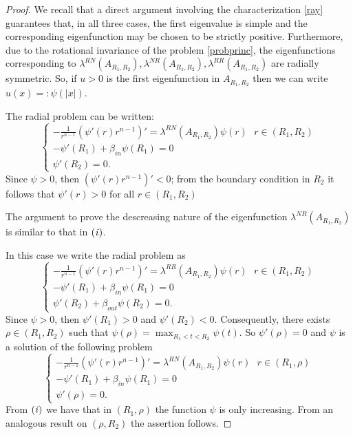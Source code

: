 \documentclass[oneside,a4paper,11pt,notitlepage]{article}
\theoremstyle{plain}
\numberwithin{teor}{section}
\numberwithin{equation}{section}
\theoremstyle{definition}
\theoremstyle{plain}
\theoremstyle{plain}
\theoremstyle{plain}
\theoremstyle{plain}
\theoremstyle{definition}
\theoremstyle{definition}
\theoremstyle{plain}
\begin{document}
\begin{proof} We recall that a direct argument involving the characterization \eqref{ray} guarantees that, in all three cases, the first eigenvalue is simple and the corresponding eigenfunction may be chosen to be strictly positive.
Furthermore, due to the rotational invariance of the problem \eqref{probprinc}, the eigenfunctions corresponding to $\lambda^{RN}(A_{R_1,R_2}),\lambda^{NR}(A_{R_1,R_2}),\lambda^{RR}(A_{R_1,R_2})$ are radially symmetric. So, if $u>0$ is the first eigenfunction in $A_{R_1,R_2}$ then we can write $u(x)=:\psi(|x|)$.
\item[\it{(i)}] The radial problem can be written:
\begin{equation}
   \begin{cases}
       \displaystyle -\frac{1}{r^{n-1}}(\psi'(r)r^{n-1})'=\lambda^{RN}(A_{R_1,R_2})\psi(r) \,\,\,\, r\in(R_1,R_2)
       \\
      - \psi'(R_1)+\beta_{in}\psi(R_1)=0
       \\
       \psi'(R_2)=0.
   \end{cases} 
\end{equation}
Since $\psi>0$, then $(\psi'(r)r^{n-1})'<0$; from the boundary condition in $R_2$ it follows that $\psi'(r)>0$ for all $r\in(R_1,R_2)$
\item[\it{(ii)}] The argument to prove the descreasing nature of the eigenfunction $\lambda^{NR}(A_{R_1,R_2})$ is similar to that in $\it{(i)}$.
\item[\it{(iii)}] In this case we write the radial problem as
\begin{equation}
   \begin{cases}
       \displaystyle -\frac{1}{r^{n-1}}(\psi'(r)r^{n-1})'=\lambda^{RR}(A_{R_1,R_2})\psi(r) \,\,\,\, r\in(R_1,R_2)
       \\
      - \psi'(R_1)+\beta_{in}\psi(R_1)=0
       \\
       \psi'(R_2)+\beta_{out}\psi(R_2)=0.
   \end{cases} 
\end{equation}
Since $\psi>0$, then $\psi'(R_1)>0$ and $\psi'(R_2)<0$. Consequently, there exists $\rho\in(R_1,R_2)$ such that $\psi(\rho)=\displaystyle \max_{R_1<t<R_2}\psi(t)$. So $\psi'(\rho)=0$ and $\psi$ is a solution of the following problem
\begin{equation}
   \begin{cases}
       \displaystyle -\frac{1}{r^{n-1}}(\psi'(r)r^{n-1})'=\lambda^{RN}(A_{R_1,R_2})\psi(r) \,\,\,\, r\in(R_1,\rho)
       \\
      - \psi'(R_1)+\beta_{in}\psi(R_1)=0
       \\
       \psi'(\rho)=0.
   \end{cases} 
\end{equation}
From $\it{(i)}$ we have that in $(R_1,\rho)$ the function $\psi$ is only increasing. From an analogous result on $(\rho,R_2)$ the assertion follows.
\end{proof}
\end{document}

